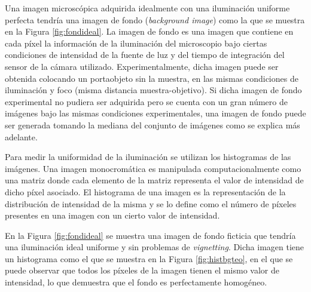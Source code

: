 Una imagen microscópica adquirida idealmente con una iluminación uniforme perfecta tendría una imagen de fondo (\textit{background image}) como la que se muestra en la Figura \ref{fig:fondideal}. La imagen de fondo es una imagen que contiene en cada píxel la información de la iluminación del microscopio bajo ciertas condiciones de intensidad de la fuente de luz y del tiempo de integración del sensor de la cámara utilizado. Experimentalmente, dicha imagen puede ser obtenida colocando un portaobjeto sin la muestra, en las mismas condiciones de iluminación y foco (misma distancia muestra-objetivo). Si dicha imagen de fondo experimental no pudiera ser adquirida pero se cuenta con un gran número de imágenes bajo las mismas condiciones experimentales, una imagen de fondo puede ser generada tomando la mediana del conjunto de imágenes como se explica más adelante.

Para medir la uniformidad de la iluminación se utilizan los histogramas de las imágenes. Una imagen monocromática es manipulada computacionalmente como una matriz donde cada elemento de la matriz representa el valor de intensidad de dicho píxel asociado. El histograma de una imagen es la representación de la distribución de intensidad de la misma y se lo define como el número de píxeles presentes en una imagen con un cierto valor de intensidad.

En la Figura \ref{fig:fondideal} se muestra una imagen de fondo ficticia que tendría una iluminación ideal uniforme y sin problemas de  \textit{vignetting}. Dicha imagen tiene un histograma como el que se muestra en la Figura \ref{fig:histbgteo}, en el que se puede observar que todos los píxeles de la imagen tienen el mismo valor de intensidad, lo que demuestra que el fondo es perfectamente homogéneo.

